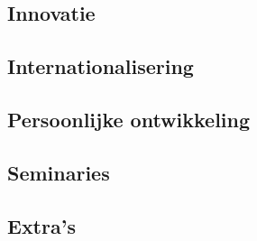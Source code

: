 

\subsection{Innovatie}

\subsection{Internationalisering}

\clearpage
\subsection{Persoonlijke ontwikkeling}

\subsection{Seminaries}

\subsection{Extra's}
